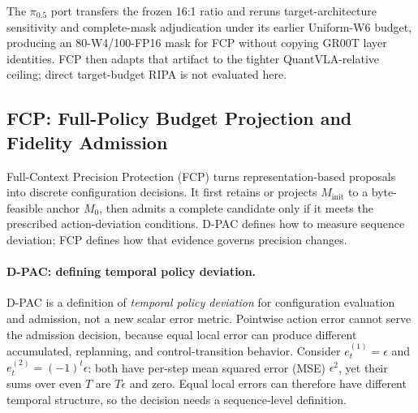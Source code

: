 The $\pi_{0.5}$ port transfers the frozen 16:1 ratio and reruns target-architecture sensitivity and complete-mask adjudication under its earlier Uniform-W6 budget, producing an 80-W4/100-FP16 mask for FCP without copying GR00T layer identities. FCP then adapts that artifact to the tighter QuantVLA-relative ceiling; direct target-budget RIPA is not evaluated here.

\subsection{FCP: Full-Policy Budget Projection and Fidelity Admission}
\label{sec:fcp}
\label{sec:dpac}

Full-Context Precision Protection (FCP) turns representation-based proposals into discrete configuration decisions. It first retains or projects $M_{\mathrm{init}}$ to a byte-feasible anchor $M_0$, then admits a complete candidate only if it meets the prescribed action-deviation conditions. D-PAC defines how to measure sequence deviation; FCP defines how that evidence governs precision changes.

\paragraph{D-PAC: defining temporal policy deviation.}
D-PAC is a definition of \emph{temporal policy deviation} for configuration evaluation and admission, not a new scalar error metric. Pointwise action error cannot serve the admission decision, because equal local error can produce different accumulated, replanning, and control-transition behavior. Consider $e_t^{(1)}=\epsilon$ and $e_t^{(2)}=(-1)^t\epsilon$: both have per-step mean squared error (MSE) $\epsilon^2$, yet their sums over even $T$ are $T\epsilon$ and zero. Equal local errors can therefore have different temporal structure, so the decision needs a sequence-level definition.

